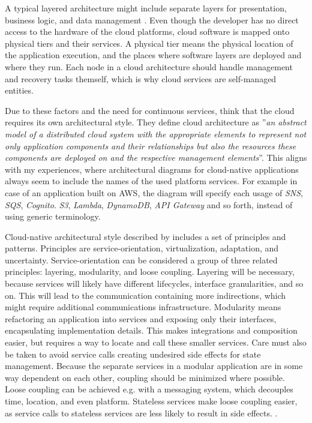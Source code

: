 \documentclass[utf8,english]{gradu3}
\begin{document}
A typical layered architecture might include separate layers for presentation,
business logic, and data management \parencite[5]{Pahl2018}. Even though the
developer has no direct access to the hardware of the cloud platforms, cloud
software is mapped onto physical tiers and their services. A physical tier means
the physical location of the application execution, and the places where
software layers are deployed and where they run. Each node in a cloud
architecture should handle management and recovery tasks themself, which is why
cloud services are self-managed entities. \parencite[5]{Pahl2018}

Due to these factors and the need for continuous services,
\textcite[5]{Pahl2018} think that the cloud requires its own architectural
style. They define cloud architecture as ''\textit{an abstract model of a distributed
cloud system with the appropriate elements to represent not only application
components and their relationships but also the resources these components are
deployed on and the respective management elements}''. This aligns with my
experiences, where architectural diagrams for cloud-native applications always
seem to include the names of the used platform services. For example in case of an
application built on AWS, the diagram will specify each usage of \textit{SNS},
\textit{SQS}, \textit{Cognito}. \textit{S3}, \textit{Lambda}, \textit{DynamoDB},
\textit{API Gateway} and so forth, instead of using generic terminology.

Cloud-native architectural style described by \textcite[5]{Pahl2018} includes a
set of principles and patterns. Principles are service-orientation,
virtualization, adaptation, and uncertainty. Service-orientation can be
considered a group of three related principles: layering, modularity, and loose
coupling. Layering will be necessary, because services will likely have
different lifecycles, interface granularities, and so on. This will lead to the
communication containing more indirections, which might require additional
communications infrastructure. Modularity means refactoring an application into
services and exposing only their interfaces, encapsulating implementation
details. This makes integrations and composition easier, but requires a way to
locate and call these smaller services. Care must also be taken to avoid service
calls creating undesired side effects for state management. Because the separate
services in a modular application are in some way dependent on each other,
coupling should be minimized where possible. Loose coupling can be achieved e.g.
with a messaging system, which decouples time, location, and even platform.
Stateless services make loose coupling easier, as service calls to stateless
services are less likely to result in side effects. \parencite[3-8]{Pahl2018}.
\end{document}
